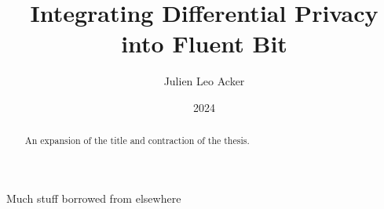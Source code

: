 

\title{Integrating Differential Privacy into Fluent Bit}
\author{Julien Leo Acker}

    
\date{2024}



\maketitle
\makedeclaration

\begin{abstract}
  An expansion of the title and contraction of the thesis.
\end{abstract}

\begin{acknowledgements}
  Much stuff borrowed from elsewhere
\end{acknowledgements}

\def\sfthing#1#2{\def#1{\mbox{{\small\normalfont\sffamily #2}}}}

\sfthing{\PP}{P}
\sfthing{\FF}{F}

\tableofcontents




% 



% 
% 
% 

\appendix






